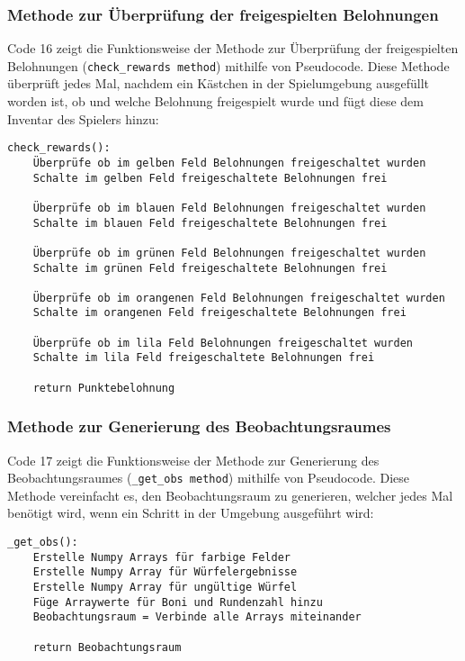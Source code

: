 \subsubsection{Methode zur Überprüfung der freigespielten Belohnungen}
\begin{minipage}{\linewidth}
Code 16 zeigt die Funktionsweise der Methode zur Überprüfung der freigespielten Belohnungen (\texttt{check\_rewards method}) mithilfe von Pseudocode. Diese Methode überprüft jedes Mal, nachdem ein Kästchen in der Spielumgebung ausgefüllt worden ist, ob und welche Belohnung freigespielt wurde und fügt diese dem Inventar des Spielers hinzu:
\vspace{0.5cm}
\begin{lstlisting}[caption={Methode zur Überprüfung der freigespielten Belohnungen}]
check_rewards():
	Überprüfe ob im gelben Feld Belohnungen freigeschaltet wurden
	Schalte im gelben Feld freigeschaltete Belohnungen frei
	
	Überprüfe ob im blauen Feld Belohnungen freigeschaltet wurden
	Schalte im blauen Feld freigeschaltete Belohnungen frei
	
	Überprüfe ob im grünen Feld Belohnungen freigeschaltet wurden
	Schalte im grünen Feld freigeschaltete Belohnungen frei
	
	Überprüfe ob im orangenen Feld Belohnungen freigeschaltet wurden
	Schalte im orangenen Feld freigeschaltete Belohnungen frei
	
	Überprüfe ob im lila Feld Belohnungen freigeschaltet wurden
	Schalte im lila Feld freigeschaltete Belohnungen frei
	
	return Punktebelohnung
\end{lstlisting}
\end{minipage}

\subsubsection{Methode zur Generierung des Beobachtungsraumes}
\begin{minipage}{\linewidth}
Code 17 zeigt die Funktionsweise der Methode zur Generierung des Beobachtungsraumes (\texttt{\_get\_obs method}) mithilfe von Pseudocode. Diese Methode vereinfacht es, den Beobachtungsraum zu generieren, welcher jedes Mal benötigt wird, wenn ein Schritt in der Umgebung ausgeführt wird:
\vspace{0.5cm}
\begin{lstlisting}[caption={Methode zur Generierung des Beobachtungsraumes}]
_get_obs():
	Erstelle Numpy Arrays für farbige Felder
	Erstelle Numpy Array für Würfelergebnisse
	Erstelle Numpy Array für ungültige Würfel
	Füge Arraywerte für Boni und Rundenzahl hinzu
	Beobachtungsraum = Verbinde alle Arrays miteinander
	
	return Beobachtungsraum
\end{lstlisting}
\end{minipage}

